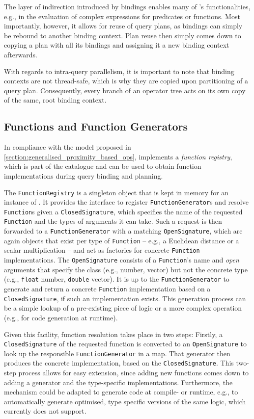 The layer of indirection introduced by bindings enables many of \cottontail{}'s functionalities, e.g., in the evaluation of complex expressions for predicates or functions. Most importantly, however, it allows for reuse of query plans, as bindings can simply be rebound to another binding context. Plan reuse then simply comes down to copying a plan with all its bindings and assigning it a new binding context afterwards. 

With regards to intra-query parallelism, it is important to note that binding contexts are not thread-safe, which is why they are copied upon partitioning of a query plan. Consequently, every branch of an operator tree acts on its own copy of the same, root binding context.

\subsection{Functions and Function Generators}

In compliance with the model proposed in \cref{section:generalised_proximity_based_ops}, \cottontail{} implements a \emph{function registry}, which is part of the catalogue and can be used to obtain function implementations during query binding and planning.

The \texttt{FunctionRegistry} is a singleton object that is kept in memory for an instance of \cottontail{}. It provides the interface to register \texttt{FunctionGenerator}s and resolve \texttt{Function}s given a \texttt{ClosedSignature}, which specifies the name of the requested \texttt{Function} and the types of arguments it can take. Such a request is then forwarded to a \texttt{FunctionGenerator} with a matching \texttt{OpenSignature}, which are again objects that exist per type of \texttt{Function} -- e.g., a Euclidean distance or a scalar multiplication -- and act as factories for concrete \texttt{Function} implementations. The \texttt{OpenSignature} consists of a \texttt{Function}'s name and \emph{open} arguments that specify the class (e.g., number, vector) but not the concrete type (e.g., \texttt{float} number, \texttt{double} vector). It is up to the \texttt{FunctionGenerator} to generate and return a concrete \texttt{Function} implementation based on a \texttt{ClosedSignature}, if such an implementation exists. This generation process can be a simple lookup of a pre-existing piece of logic or a more complex operation (e.g., for code generation at runtime).

Given this facility, function resolution takes place in two steps: Firstly, a \texttt{ClosedSignature} of the requested function is converted to an \texttt{OpenSignature} to look up the responsible \texttt{FunctionGenerator} in a map. That generator then produces the concrete implementation, based on the \texttt{ClosedSignature}. This two-step process allows for easy extension, since adding new functions comes down to adding a generator and the type-specific implementations. Furthermore, the mechanism could be adapted to generate code at compile- or runtime, e.g., to automatically generate optimised, type specific versions of the same logic, which \cottontail{} currently does not support.

